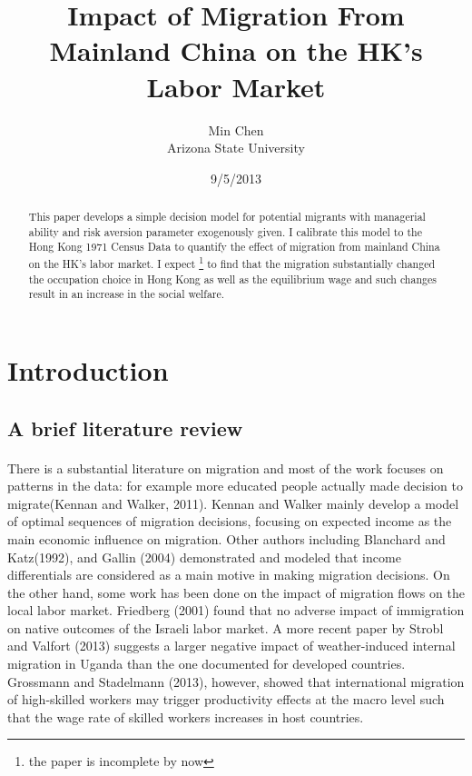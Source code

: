 \documentclass[12pt]{article}
\begin{document}
\title{Impact of Migration From Mainland China on the HK's Labor Market}
\author{Min Chen\\Arizona State University}
\date{9/5/2013}
\maketitle
\bigskip
\begin{abstract}
This paper develops a simple decision model for potential migrants with managerial ability and risk aversion parameter exogenously given. I calibrate this model to the Hong Kong 1971 Census Data to quantify the effect of migration from mainland China on the HK's labor market. I expect \footnote{the paper is incomplete by now} to find that the migration substantially changed the occupation choice in Hong Kong as well as the equilibrium wage and such changes result in an increase in the social welfare. 
\end{abstract}
\pagebreak
\tableofcontents
\listoffigures
\listoftables
\pagebreak

\section{Introduction}
\subsection{A brief literature review}
\paragraph{}
There is a substantial literature on migration and most of the work focuses on patterns in the data: for example more educated people actually made decision to migrate(Kennan and Walker, 2011). Kennan and Walker mainly develop a model of optimal sequences of migration decisions, focusing on expected income as the main economic influence on migration. Other authors including Blanchard and Katz(1992), and Gallin (2004) demonstrated and modeled that income differentials are considered as a main motive in making migration decisions. On the other hand, some work has been done on the impact of migration flows on the local labor market. Friedberg (2001) found that no adverse impact of immigration on native outcomes of the Israeli labor market. A more recent paper by Strobl and Valfort (2013) suggests a larger negative impact of weather-induced internal migration in Uganda than the one documented for developed countries. Grossmann and Stadelmann (2013), however, showed that international migration of high-skilled workers may trigger productivity effects at the macro level such that the wage rate of skilled workers increases in host countries.
\end{document}
